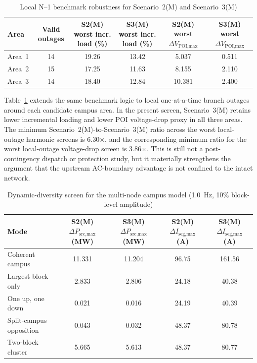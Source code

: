 \documentclass[11pt]{article}
\begin{document}
\begin{table}[t]
    \centering
    \caption{Local N--1 benchmark robustness for Scenario~2(M) and Scenario~3(M)}
    \label{tab:nminusone}
    \begin{tabular}{p{0.8in}ccccc}
        \toprule
        Area & Valid outages & S2(M) worst incr. load (\%) & S3(M) worst incr. load (\%) & S2(M) worst $\Delta V_{\text{POI,max}}$ & S3(M) worst $\Delta V_{\text{POI,max}}$ \\
        \midrule
        Area~1 & 14 & 19.26 & 13.42 & 5.037 & 0.511 \\
        Area~2 & 15 & 17.25 & 11.63 & 8.155 & 2.110 \\
        Area~3 & 14 & 18.40 & 12.84 & 10.381 & 2.400 \\
        \bottomrule
    \end{tabular}
\end{table}

Table~\ref{tab:nminusone} extends the same benchmark logic to local one-at-a-time branch outages around each candidate campus area. In the present screen, Scenario~3(M) retains lower incremental loading and lower POI voltage-drop proxy in all three areas. The minimum Scenario~2(M)-to-Scenario~3(M) ratio across the worst local-outage harmonic screens is 6.30$\times$, and the corresponding minimum ratio for the worst local-outage voltage-drop screen is 3.86$\times$. This is still not a post-contingency dispatch or protection study, but it materially strengthens the argument that the upstream AC-boundary advantage is not confined to the intact network.

\begin{table}[t]
    \centering
    \caption{Dynamic-diversity screen for the multi-node campus model (1.0~Hz, 10\% block-level amplitude)}
    \label{tab:dynamicdiversity}
    \begin{tabular}{p{1.7in}cccc}
        \toprule
        Mode & S2(M) $\Delta P_{\text{src,max}}$ (MW) & S3(M) $\Delta P_{\text{src,max}}$ (MW) & S2(M) $\Delta I_{\text{seg,max}}$ (A) & S3(M) $\Delta I_{\text{seg,max}}$ (A) \\
        \midrule
        Coherent campus & 11.331 & 11.204 & 96.75 & 161.56 \\
        Largest block only & 2.833 & 2.806 & 24.18 & 40.38 \\
        One up, one down & 0.021 & 0.016 & 24.19 & 40.39 \\
        Split-campus opposition & 0.043 & 0.032 & 48.37 & 80.78 \\
        Two-block cluster & 5.665 & 5.613 & 48.37 & 80.77 \\
        \bottomrule
    \end{tabular}
\end{table}
\end{document}
